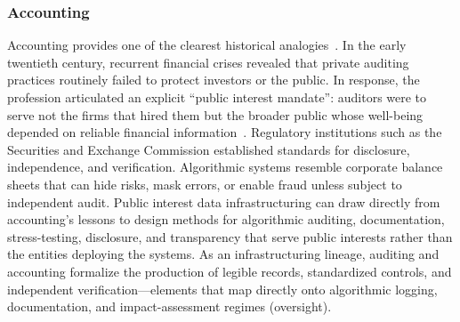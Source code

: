 \documentclass[acmsmall,screen]{acmart}
\begin{document}
\subsubsection*{Accounting}
Accounting provides one of the clearest historical analogies~\cite{carnegieCriticalInterpretiveHistories1996,leeProfessionalizationAccountancyHistory1995}. In the early twentieth century, recurrent financial crises revealed that private auditing practices routinely failed to protect investors or the public. In response, the profession articulated an explicit ``public interest mandate'': auditors were to serve not the firms that hired them but the broader public whose well-being depended on reliable financial information~\cite{quayleWhistleblowingAccountingPublic2021,bakerWhatMeaningPublic2005,dellaportasReflectionsPublicInterest2008}. Regulatory institutions such as the Securities and Exchange Commission established standards for disclosure, independence, and verification. Algorithmic systems resemble corporate balance sheets that can hide risks, mask errors, or enable fraud unless subject to independent audit. Public interest data infrastructuring can draw directly from accounting's lessons to design methods for algorithmic auditing, documentation, stress-testing, disclosure, and transparency that serve public interests rather than the entities deploying the systems. As an infrastructuring lineage, auditing and accounting formalize the production of legible records, standardized controls, and independent verification---elements that map directly onto algorithmic logging, documentation, and impact-assessment regimes (oversight).
\end{document}
